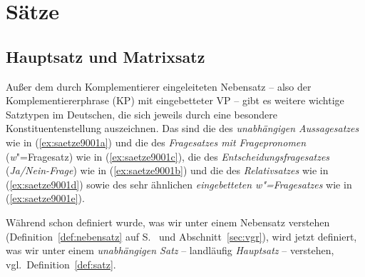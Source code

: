 \chapter{Sätze}

\label{sec:saetze}

\section{Hauptsatz und Matrixsatz}

\label{sec:hauptsatzmatrixsatz}

Außer dem durch Komplementierer eingeleiteten Nebensatz -- also der Komplementiererphrase (KP) mit eingebetteter VP -- gibt es weitere wichtige Satztypen im Deutschen, die sich jeweils durch eine besondere Konstituentenstellung auszeichnen.
Das sind die des \textit{unabhängigen Aussagesatzes} wie in (\ref{ex:saetze9001a}) und die des \textit{Fragesatzes mit Fragepronomen} (\textit{w}"=Fragesatz) wie in (\ref{ex:saetze9001c}), die des \textit{Entscheidungsfragesatzes} (\textit{Ja\slash Nein-Frage}) wie in (\ref{ex:saetze9001b}) und die des \textit{Relativsatzes} wie in (\ref{ex:saetze9001d}) sowie des sehr ähnlichen \textit{eingebetteten \textit{w}"=Fragesatzes} wie in (\ref{ex:saetze9001e}).

\begin{exe}
  \ex\label{ex:saetze9001}
  \begin{xlist}
  \end{xlist}
\end{exe}

Während schon definiert wurde, was wir unter einem Nebensatz verstehen (Definition~\ref{def:nebensatz} auf S.~\pageref{def:nebensatz} und Abschnitt~\ref{sec:vgr}), wird jetzt definiert, was wir unter einem \textit{unabhängigen Satz} -- landläufig \textit{Hauptsatz} -- verstehen, vgl.\ Definition~\ref{def:satz}.

\Stretch[0.5]


